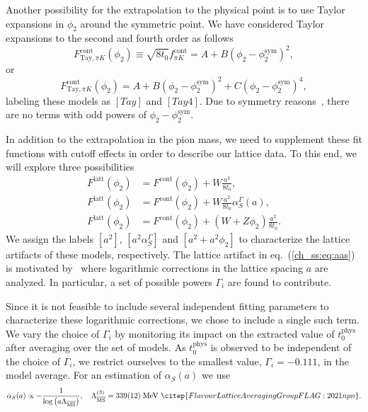 Another possibility for the extrapolation to the physical point is to use Taylor expansions in $\phi_2$ around the symmetric point. We have considered Taylor expansions to the second and fourth order as follows
\begin{equation}
\label{ch_ss:eq:Tay}
F_{\textrm{Tay},\pi K}^{\textrm{cont}}(\phi_2)\equiv\sqrt{8t_0}f_{\pi K}^{\textrm{cont}}=A+B\left(\phi_2-\phi_2^{\textrm{sym}}\right)^2,
\end{equation}
or
\begin{equation}
\label{ch_ss:eq:Tay4}
F_{\textrm{Tay},\pi K}^{\textrm{cont}}(\phi_2)=A+B\left(\phi_2-\phi_2^{\textrm{sym}}\right)^2+C\left(\phi_2-\phi_2^{\textrm{sym}}\right)^4,
\end{equation}
labeling these models as $[Tay]$ and $[Tay4]$. Due to symmetry reasons~\citep{Bietenholz:2011qq}, there are no terms with odd powers of $\phi_2-\phi_2^{\textrm{sym}}$.

In addition to the extrapolation in the pion mass, we need to supplement these fit functions with cutoff effects in order to describe our lattice data. To this end, we will explore three possibilities
\begin{align}
\label{ch_ss:eq:a2}
F^{\textrm{latt}}(\phi_2)&=F^{\textrm{cont}}(\phi_2)+W\frac{a^2}{8t_0},\\
\label{ch_ss:eq:aas}
F^{\textrm{latt}}(\phi_2)&=F^{\textrm{cont}}(\phi_2)+W\frac{a^2}{8t_0}\alpha_S^{\Gamma}(a),\\
\label{ch_ss:eq:a2phi2}
F^{\textrm{latt}}(\phi_2)&=F^{\textrm{cont}}(\phi_2)+\left(W+Z\phi_2\right)\frac{a^2}{8t_0}.
\end{align}
We assign the labels $[a^2]$, $[a^2\alpha_S^{\Gamma}]$ and $[a^2+a^2\phi_2]$ to characterize the lattice artifacts of these models, respectively. The lattice artifact in eq.~(\ref{ch_ss:eq:aas}) is motivated by~\citep{Husung:2022kvi} where logarithmic corrections in the lattice spacing $a$ are analyzed. In particular, a set of possible powers $\Gamma_i$ are found to contribute. 

Since it is not feasible to include several independent fitting parameters to characterize these logarithmic corrections, we chose to include a single such term. We vary the choice of $\Gamma_i$ by monitoring its impact on the extracted value of $t_0^{\textrm{phys}}$ after averaging over the set of models. As $t_0^{\textrm{phys}}$ is observed to be independent of the choice of $\Gamma_i$, we restrict ourselves to the smallest value, $\Gamma_i=-0.111$, in the model average. For an estimation of $\alpha_S(a)$ we use
\begin{gather}
\alpha_S(a)\propto-\frac{1}{\textrm{log}\left(a\Lambda_{\overline{\textrm{MS}}}\right)}, \quad \Lambda_{\overline{\textrm{MS}}}^{(3)}=339(12)\;\textrm{MeV}~\citep{FlavourLatticeAveragingGroupFLAG:2021npn}.
\end{gather}

